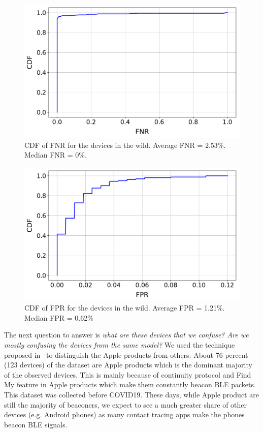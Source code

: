 \begin{figure}[t!]
    \centering
    \includegraphics[width = \linewidth]{plots/fnr_cdf.pdf} 
    \caption{CDF of FNR for the devices in the wild. Average FNR = 2.53\%. Median FNR = 0\%.}
    \label{fig:fnr_cdf}
\end{figure}

\begin{figure}[t!]
    \centering
    \includegraphics[width = \linewidth]{plots/fpr_cdf.pdf} 
    \caption{CDF of FPR for the devices in the wild. Average FPR = 1.21\%. Median FPR = 0.62\%}
    \label{fig:fpr_cdf}
\end{figure}

The next question to answer is \textit{what are these devices that we confuse? Are we mostly confusing the devices from the same model?} We used the technique proposed in~\cite{celosia2020close} to distinguish the Apple products from others. About 76 percent (123 devices) of the dataset are Apple products which is the dominant majority of the observed devices. This is mainly because of continuity protocol and Find My feature in Apple products which make them constantly beacon BLE packets. This dataset was collected before COVID19. These days, while Apple product are still the majority of beaconers, we expect to see a much greater share of other devices (e.g. Android phones) as many contact tracing apps make the phones beacon BLE signals. 

